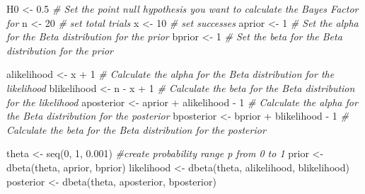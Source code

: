 \documentclass[
]{krantz}
\newenvironment{Shaded}{\begin{snugshade}}{\end{snugshade}}
\newcommand{\CommentTok}[1]{\textcolor[rgb]{0.56,0.35,0.01}{\textit{#1}}}
\newcommand{\DecValTok}[1]{\textcolor[rgb]{0.00,0.00,0.81}{#1}}
\newcommand{\FloatTok}[1]{\textcolor[rgb]{0.00,0.00,0.81}{#1}}
\newcommand{\FunctionTok}[1]{\textcolor[rgb]{0.00,0.00,0.00}{#1}}
\newcommand{\NormalTok}[1]{#1}
\newcommand{\OtherTok}[1]{\textcolor[rgb]{0.56,0.35,0.01}{#1}}
\newcommand{\SpecialCharTok}[1]{\textcolor[rgb]{0.00,0.00,0.00}{#1}}
\begin{document}
\begin{Shaded}
\begin{Highlighting}[]
\NormalTok{H0 }\OtherTok{\textless{}{-}} \FloatTok{0.5} \CommentTok{\# Set the point null hypothesis you want to calculate the Bayes Factor for}
\NormalTok{n }\OtherTok{\textless{}{-}} \DecValTok{20} \CommentTok{\# set total trials}
\NormalTok{x }\OtherTok{\textless{}{-}} \DecValTok{10} \CommentTok{\# set successes}
\NormalTok{aprior }\OtherTok{\textless{}{-}} \DecValTok{1} \CommentTok{\# Set the alpha for the Beta distribution for the prior}
\NormalTok{bprior }\OtherTok{\textless{}{-}} \DecValTok{1} \CommentTok{\# Set the beta for the Beta distribution for the prior}

\NormalTok{alikelihood }\OtherTok{\textless{}{-}}\NormalTok{ x }\SpecialCharTok{+} \DecValTok{1} \CommentTok{\# Calculate the alpha for the Beta distribution for the likelihood}
\NormalTok{blikelihood }\OtherTok{\textless{}{-}}\NormalTok{ n }\SpecialCharTok{{-}}\NormalTok{ x }\SpecialCharTok{+} \DecValTok{1} \CommentTok{\# Calculate the beta for the Beta distribution for the likelihood}
\NormalTok{aposterior }\OtherTok{\textless{}{-}}\NormalTok{ aprior }\SpecialCharTok{+}\NormalTok{ alikelihood }\SpecialCharTok{{-}} \DecValTok{1} \CommentTok{\# Calculate the alpha for the Beta distribution for the posterior}
\NormalTok{bposterior }\OtherTok{\textless{}{-}}\NormalTok{ bprior }\SpecialCharTok{+}\NormalTok{ blikelihood }\SpecialCharTok{{-}} \DecValTok{1} \CommentTok{\# Calculate the beta for the Beta distribution for the posterior}

\NormalTok{theta }\OtherTok{\textless{}{-}} \FunctionTok{seq}\NormalTok{(}\DecValTok{0}\NormalTok{, }\DecValTok{1}\NormalTok{, }\FloatTok{0.001}\NormalTok{) }\CommentTok{\#create probability range p from 0 to 1}
\NormalTok{prior }\OtherTok{\textless{}{-}} \FunctionTok{dbeta}\NormalTok{(theta, aprior, bprior)}
\NormalTok{likelihood }\OtherTok{\textless{}{-}} \FunctionTok{dbeta}\NormalTok{(theta, alikelihood, blikelihood)}
\NormalTok{posterior }\OtherTok{\textless{}{-}} \FunctionTok{dbeta}\NormalTok{(theta, aposterior, bposterior)}


\end{Highlighting}
\end{Shaded}
\end{document}
